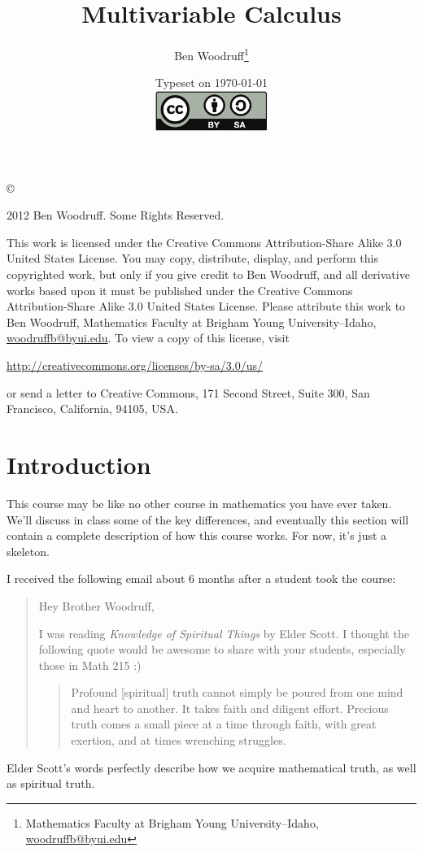 \documentclass[letterpaper,oneside]{book}%
\newcommand{\larsonfive}[1]{}
\theoremstyle{plain}
\theoremstyle{box}
\theoremstyle{problem}
\begin{document}
\frontmatter
\title{Multivariable Calculus}
\author{Ben Woodruff\thanks{Mathematics Faculty at Brigham Young
    University--Idaho, \url{woodruffb@byui.edu}}}
\date{Typeset on \today\\
\vfill
\includegraphics[height=1.3cm]{by-sa}
\vfill
\larsonfive{With references to \emph{Calculus, Early Transcendental
    Functions}, 5th edition, by Larson and Edwards}}
\maketitle
\thispagestyle{empty}
\noindent\copyright{ 2012 Ben Woodruff.  Some Rights Reserved.\\

\bigskip

\noindent This work is licensed under the Creative Commons Attribution-Share Alike 3.0 United States License.  You may copy, distribute, display, and perform this copyrighted work, but only if you give credit to Ben Woodruff, and all derivative works based upon it must be published under the Creative Commons Attribution-Share Alike 3.0 United States License. Please attribute this work to Ben Woodruff, Mathematics Faculty at Brigham Young University--Idaho, \url{woodruffb@byui.edu}. To view a copy of this license, visit
\begin{center}
  \url{http://creativecommons.org/licenses/by-sa/3.0/us/}
\end{center}
or send a letter to Creative Commons, 171 Second Street, Suite 300, San Francisco, California, 94105, USA.}

\chapter*{Introduction}
This course may be like no other course in mathematics you have ever taken.  We'll discuss in class some of the key differences, and eventually this section will contain a complete description of how this course works. For now, it's just a skeleton.

I received the following email about 6 months after a student took the course:

\begin{quote}
Hey Brother Woodruff,

I was reading {\it Knowledge of Spiritual Things} by Elder Scott.
I thought the following quote would be awesome to share with your
students, especially those in Math 215 :)

\begin{quote}
Profound [spiritual] truth cannot simply be poured
from one mind and heart to another. It takes faith
and diligent effort. Precious truth comes a small
piece at a time through faith, with great exertion,
and at times wrenching struggles.
\end{quote}
\end{quote}
Elder Scott's words perfectly describe how we acquire mathematical truth, as well as spiritual truth. 
\end{document}
